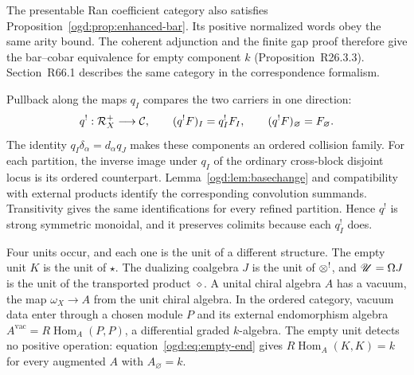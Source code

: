 The presentable Ran coefficient category also satisfies Proposition~\ref{ogd:prop:enhanced-bar}.
Its positive normalized words obey the same arity bound.
The coherent adjunction and the finite gap proof therefore give the bar--cobar equivalence for empty component $k$
(Proposition~\textup{R26.3.3}).
Section~\textup{R66.1} describes the same category in the correspondence formalism.

Pullback along the maps \(q_I\) compares the two carriers in one direction:
\[
 q^!:\mathcal R_X^+\longrightarrow\mathcal C,
 \qquad (q^!F)_I=q_I^!F_I,\qquad(q^!F)_\varnothing=F_\varnothing.
\]
The identity \(q_I\delta_\alpha=d_\alpha q_J\) makes these components an ordered collision family.
For each partition, the inverse image under \(q_I\) of the ordinary cross-block disjoint locus is its ordered counterpart.
Lemma~\ref{ogd:lem:basechange} and compatibility with external products identify the corresponding convolution summands.
Transitivity gives the same identifications for every refined partition.
Hence \(q^!\) is strong symmetric monoidal, and it preserves colimits because each \(q_I^!\) does.

Four\label{ogd:def:three-tensor-units} units occur, and each one is the unit of a different structure.
The empty unit \(K\) is the unit of \(\star\).
The dualizing coalgebra \(J\) is the unit of \(\mathbin{\otimes^!}\), and \(\mathscr U=\Omega J\) is the unit of the transported product \(\diamond\).
A unital chiral algebra \(A\) has a vacuum, the map \(\omega_X\to A\) from the unit chiral algebra.
In the ordered category, vacuum data enter through a chosen module \(P\) and its external endomorphism algebra \(A^{\mathrm{vac}}=R\operatorname{Hom}_A(P,P)\), a differential graded \(k\)-algebra.
The empty unit detects no positive operation: equation~\eqref{ogd:eq:empty-end} gives \(R\operatorname{Hom}_A(K,K)=k\) for every augmented \(A\) with \(A_\varnothing=k\).

